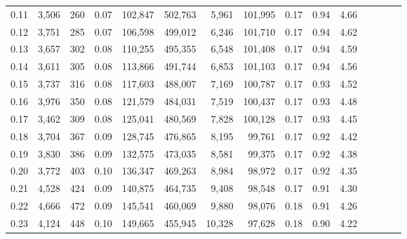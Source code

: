 \begin{tabular}{rrrcrrrrrrrrrrr}
0.11 &   3,506 &     260 &                                       0.07 &  102,847 &  502,763 &    5,961 &  101,995 &  0.17 &  0.94 &                         4.66 \\
0.12 &   3,751 &     285 &                                       0.07 &  106,598 &  499,012 &    6,246 &  101,710 &  0.17 &  0.94 &                         4.62 \\
0.13 &   3,657 &     302 &                                       0.08 &  110,255 &  495,355 &    6,548 &  101,408 &  0.17 &  0.94 &                         4.59 \\
0.14 &   3,611 &     305 &                                       0.08 &  113,866 &  491,744 &    6,853 &  101,103 &  0.17 &  0.94 &                         4.56 \\
0.15 &   3,737 &     316 &                                       0.08 &  117,603 &  488,007 &    7,169 &  100,787 &  0.17 &  0.93 &                         4.52 \\
0.16 &   3,976 &     350 &                                       0.08 &  121,579 &  484,031 &    7,519 &  100,437 &  0.17 &  0.93 &                         4.48 \\
0.17 &   3,462 &     309 &                                       0.08 &  125,041 &  480,569 &    7,828 &  100,128 &  0.17 &  0.93 &                         4.45 \\
0.18 &   3,704 &     367 &                                       0.09 &  128,745 &  476,865 &    8,195 &   99,761 &  0.17 &  0.92 &                         4.42 \\
0.19 &   3,830 &     386 &                                       0.09 &  132,575 &  473,035 &    8,581 &   99,375 &  0.17 &  0.92 &                         4.38 \\
0.20 &   3,772 &     403 &                                       0.10 &  136,347 &  469,263 &    8,984 &   98,972 &  0.17 &  0.92 &                         4.35 \\
0.21 &   4,528 &     424 &                                       0.09 &  140,875 &  464,735 &    9,408 &   98,548 &  0.17 &  0.91 &                         4.30 \\
0.22 &   4,666 &     472 &                                       0.09 &  145,541 &  460,069 &    9,880 &   98,076 &  0.18 &  0.91 &                         4.26 \\
0.23 &   4,124 &     448 &                                       0.10 &  149,665 &  455,945 &   10,328 &   97,628 &  0.18 &  0.90 &                         4.22 \\

\end{tabular}
